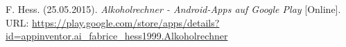 \begin{thebibliography}{9}
  
  F. Hess. (25.05.2015). \emph{Alkoholrechner - Android-Apps auf Google Play} [Online]. URL: \url{https://play.google.com/store/apps/details?id=appinventor.ai_fabrice_hess1999.Alkoholrechner}

\end{thebibliography}